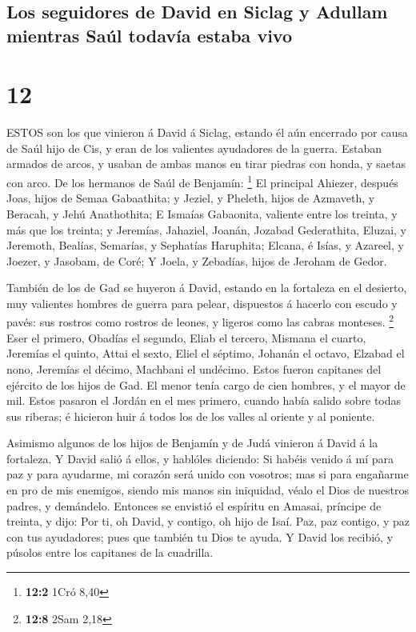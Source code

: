 \hypertarget{los-seguidores-de-david-en-siclag-y-adullam-mientras-sauxfal-todavuxeda-estaba-vivo}{%
\subsection{Los seguidores de David en Siclag y Adullam mientras Saúl
todavía estaba
vivo}\label{los-seguidores-de-david-en-siclag-y-adullam-mientras-sauxfal-todavuxeda-estaba-vivo}}

\hypertarget{section-11}{%
\section{12}\label{section-11}}

 ESTOS son los que vinieron á David á Siclag, estando él aún
encerrado por causa de Saúl hijo de Cis, y eran de los valientes
ayudadores de la guerra.  Estaban armados de arcos, y usaban
de ambas manos en tirar piedras con honda, y saetas con arco. De los
hermanos de Saúl de Benjamín: \footnote{\textbf{12:2} 1Cró 8,40}
 El principal Ahiezer, después Joas, hijos de Semaa
Gabaathita; y Jeziel, y Pheleth, hijos de Azmaveth, y Beracah, y Jehú
Anathothita;  E Ismaías Gabaonita, valiente entre los
treinta, y más que los treinta; y Jeremías, Jahaziel, Joanán, Jozabad
Gederathita,  Eluzai, y Jeremoth, Bealías, Semarías, y
Sephatías Haruphita;  Elcana, é Isías, y Azareel, y Joezer,
y Jasobam, de Coré;  Y Joela, y Zebadías, hijos de Jeroham
de Gedor.

 También de los de Gad se huyeron á David, estando en la
fortaleza en el desierto, muy valientes hombres de guerra para pelear,
dispuestos á hacerlo con escudo y pavés: sus rostros como rostros de
leones, y ligeros como las cabras monteses. \footnote{\textbf{12:8} 2Sam
  2,18}  Eser el primero, Obadías el segundo, Eliab el
tercero,  Mismana el cuarto, Jeremías el quinto,
 Attai el sexto, Eliel el séptimo,  Johanán el
octavo, Elzabad el nono,  Jeremías el décimo, Machbani el
undécimo.  Estos fueron capitanes del ejército de los hijos
de Gad. El menor tenía cargo de cien hombres, y el mayor de mil.
 Estos pasaron el Jordán en el mes primero, cuando había
salido sobre todas sus riberas; é hicieron huir á todos los de los
valles al oriente y al poniente.

 Asimismo algunos de los hijos de Benjamín y de Judá
vinieron á David á la fortaleza.  Y David salió á ellos, y
hablóles diciendo: Si habéis venido á mí para paz y para ayudarme, mi
corazón será unido con vosotros; mas si para engañarme en pro de mis
enemigos, siendo mis manos sin iniquidad, véalo el Dios de nuestros
padres, y demándelo.  Entonces se envistió el espíritu en
Amasai, príncipe de treinta, y dijo: Por ti, oh David, y contigo, oh
hijo de Isaí. Paz, paz contigo, y paz con tus ayudadores; pues que
también tu Dios te ayuda. Y David los recibió, y púsolos entre los
capitanes de la cuadrilla.

